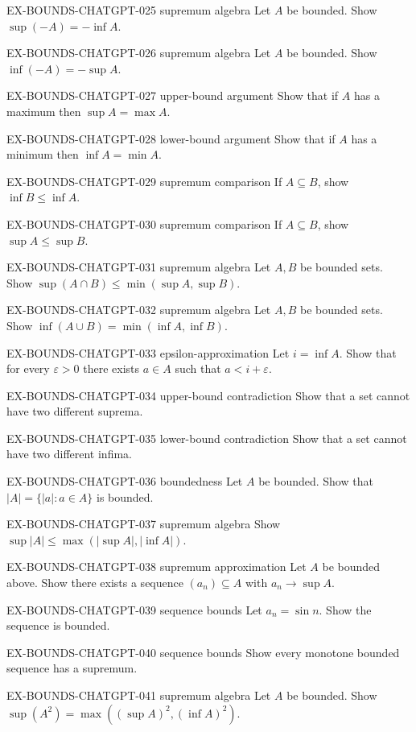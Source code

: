 \exstubgen
{EX-BOUNDS-CHATGPT-025}
{supremum algebra}
{Let $A$ be bounded. Show $\sup(-A)=-\inf A$.}

\exstubgen
{EX-BOUNDS-CHATGPT-026}
{supremum algebra}
{Let $A$ be bounded. Show $\inf(-A)=-\sup A$.}

\exstubgen
{EX-BOUNDS-CHATGPT-027}
{upper-bound argument}
{Show that if $A$ has a maximum then $\sup A=\max A$.}

\exstubgen
{EX-BOUNDS-CHATGPT-028}
{lower-bound argument}
{Show that if $A$ has a minimum then $\inf A=\min A$.}

\exstubgen
{EX-BOUNDS-CHATGPT-029}
{supremum comparison}
{If $A\subseteq B$, show $\inf B\le \inf A$.}

\exstubgen
{EX-BOUNDS-CHATGPT-030}
{supremum comparison}
{If $A\subseteq B$, show $\sup A\le \sup B$.}

\exstubgen
{EX-BOUNDS-CHATGPT-031}
{supremum algebra}
{Let $A,B$ be bounded sets. Show $\sup(A\cap B)\le\min(\sup A,\sup B)$.}

\exstubgen
{EX-BOUNDS-CHATGPT-032}
{supremum algebra}
{Let $A,B$ be bounded sets. Show $\inf(A\cup B)=\min(\inf A,\inf B)$.}

\exstubgen
{EX-BOUNDS-CHATGPT-033}
{epsilon-approximation}
{Let $i=\inf A$. Show that for every $\varepsilon>0$ there exists $a\in A$
such that $a<i+\varepsilon$.}

\exstubgen
{EX-BOUNDS-CHATGPT-034}
{upper-bound contradiction}
{Show that a set cannot have two different suprema.}

\exstubgen
{EX-BOUNDS-CHATGPT-035}
{lower-bound contradiction}
{Show that a set cannot have two different infima.}

\exstubgen
{EX-BOUNDS-CHATGPT-036}
{boundedness}
{Let $A$ be bounded. Show that $|A|=\{|a|:a\in A\}$ is bounded.}

\exstubgen
{EX-BOUNDS-CHATGPT-037}
{supremum algebra}
{Show $\sup|A|\le\max(|\sup A|,|\inf A|)$.}

\exstubgen
{EX-BOUNDS-CHATGPT-038}
{supremum approximation}
{Let $A$ be bounded above. Show there exists a sequence $(a_n)\subseteq A$
with $a_n\to\sup A$.}

\exstubgen
{EX-BOUNDS-CHATGPT-039}
{sequence bounds}
{Let $a_n=\sin n$. Show the sequence is bounded.}

\exstubgen
{EX-BOUNDS-CHATGPT-040}
{sequence bounds}
{Show every monotone bounded sequence has a supremum.}

\exstubgen
{EX-BOUNDS-CHATGPT-041}
{supremum algebra}
{Let $A$ be bounded. Show $\sup(A^2)=\max((\sup A)^2,(\inf A)^2)$.}

